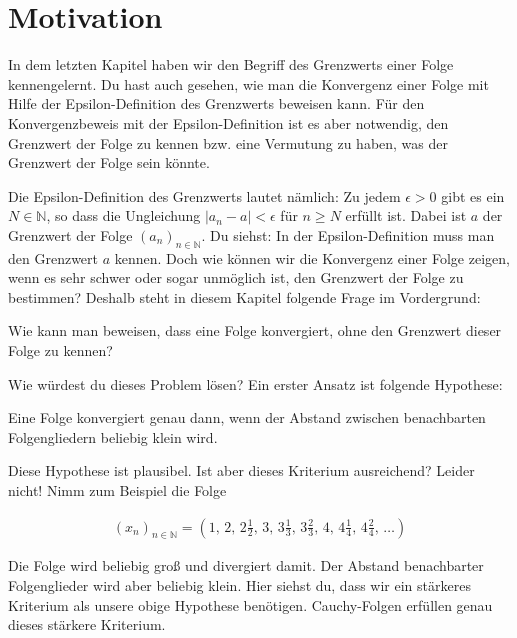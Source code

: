 \documentclass[fontsize=9pt,
               parskip=half-,
               DIV=14,
               listof=chapterentry,
               tocflat]{scrbook}
\begin{document}
\section{Motivation}

In dem letzten Kapitel haben wir den Begriff des Grenzwerts einer Folge kennengelernt. Du hast auch gesehen, wie man die Konvergenz einer Folge mit Hilfe der Epsilon-Definition des Grenzwerts beweisen kann. Für den Konvergenzbeweis mit der Epsilon-Definition ist es aber notwendig, den Grenzwert der Folge zu kennen bzw. eine Vermutung zu haben, was der Grenzwert der Folge sein könnte.

Die Epsilon-Definition des Grenzwerts lautet nämlich: Zu jedem $\epsilon >0$ gibt es ein $N\in \mathbb {N} $, so dass die Ungleichung $|a_{n}-a|<\epsilon $ für $n\geq N$ erfüllt ist. Dabei ist $a$ der Grenzwert der Folge $(a_{n})_{n\in \mathbb {N} }$. Du siehst: In der Epsilon-Definition muss man den Grenzwert $a$ kennen. Doch wie können wir die Konvergenz einer Folge zeigen, wenn es sehr schwer oder sogar unmöglich ist, den Grenzwert der Folge zu bestimmen? Deshalb steht in diesem Kapitel folgende Frage im Vordergrund:

\begin{importantparagraph*}
Wie kann man beweisen, dass eine Folge konvergiert, ohne den Grenzwert dieser Folge zu kennen?

\end{importantparagraph*}

Wie würdest du dieses Problem lösen? Ein erster Ansatz ist folgende Hypothese:

\begin{importantparagraph*}
Eine Folge konvergiert genau dann, wenn der Abstand zwischen benachbarten Folgengliedern beliebig klein wird.

\end{importantparagraph*}

Diese Hypothese ist plausibel. Ist aber dieses Kriterium ausreichend? Leider nicht! Nimm zum Beispiel die Folge

\begin{align*}
(x_{n})_{n\in \mathbb {N} }=\left(1,\,2,\,2{\tfrac {1}{2}},\,3,\,3{\tfrac {1}{3}},\,3{\tfrac {2}{3}},\,4,\,4{\tfrac {1}{4}},\,4{\tfrac {2}{4}},\,\ldots \right)
\end{align*}

Die Folge wird beliebig groß und divergiert damit. Der Abstand benachbarter Folgenglieder wird aber beliebig klein. Hier siehst du, dass wir ein stärkeres Kriterium als unsere obige Hypothese benötigen. Cauchy-Folgen erfüllen genau dieses stärkere Kriterium.
\end{document}
